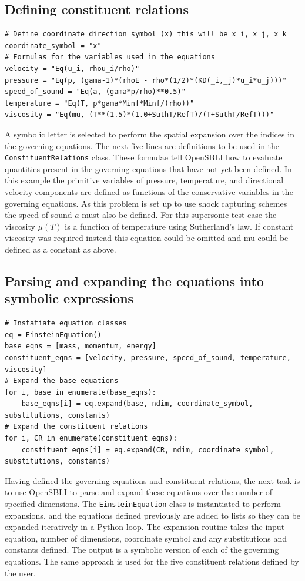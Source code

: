 \documentclass[11pt]{article}
\begin{document}
\subsection{Defining constituent relations}
\begin{lstlisting}
# Define coordinate direction symbol (x) this will be x_i, x_j, x_k
coordinate_symbol = "x"
# Formulas for the variables used in the equations
velocity = "Eq(u_i, rhou_i/rho)"
pressure = "Eq(p, (gama-1)*(rhoE - rho*(1/2)*(KD(_i,_j)*u_i*u_j)))"
speed_of_sound = "Eq(a, (gama*p/rho)**0.5)"
temperature = "Eq(T, p*gama*Minf*Minf/(rho))"
viscosity = "Eq(mu, (T**(1.5)*(1.0+SuthT/RefT)/(T+SuthT/RefT)))"
\end{lstlisting}
A symbolic letter is selected to perform the spatial expansion over the indices in the governing equations. The next five lines are definitions to be used in the \verb|ConstituentRelations| class. These formulae tell OpenSBLI how to evaluate quantities present in the governing equations that have not yet been defined. In this example the primitive variables of pressure, temperature, and directional velocity components are defined as functions of the conservative variables in the governing equations. As this problem is set up to use shock capturing schemes the speed of sound $a$ must also be defined. For this supersonic test case the viscosity $\mu(T)$ is a function of temperature using Sutherland's law. If constant viscosity was required instead this equation could be omitted and mu could be defined as a constant as above.

\subsection{Parsing and expanding the equations into symbolic expressions}
\begin{lstlisting}
# Instatiate equation classes
eq = EinsteinEquation()
base_eqns = [mass, momentum, energy]
constituent_eqns = [velocity, pressure, speed_of_sound, temperature, viscosity]
# Expand the base equations
for i, base in enumerate(base_eqns):
    base_eqns[i] = eq.expand(base, ndim, coordinate_symbol, substitutions, constants)
# Expand the constituent relations
for i, CR in enumerate(constituent_eqns):
    constituent_eqns[i] = eq.expand(CR, ndim, coordinate_symbol, substitutions, constants)
\end{lstlisting}

Having defined the governing equations and constituent relations, the next task is to use OpenSBLI to parse and expand these equations over the number of specified dimensions. The \verb|EinsteinEquation| class is instantiated to perform expansions, and the equations defined previously are added to lists so they can be expanded iteratively in a Python loop. The expansion routine takes the input equation, number of dimensions, coordinate symbol and any substitutions and constants defined. The output is a symbolic version of each of the governing equations. The same approach is used for the five constituent relations defined by the user.
\end{document}
